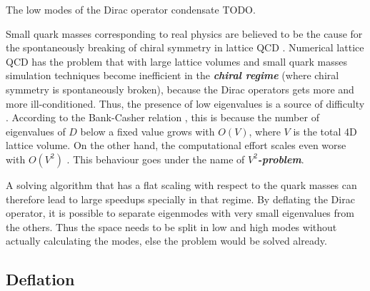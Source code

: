 \documentclass{article}
\theoremstyle{plain} %
\theoremstyle{convention} %
\theoremstyle{remark} %
\def\df#1{\textbf{\textit{#1}}}
\numberwithin{equation}{section}
\begin{document}
The low modes of the Dirac operator condensate TODO.

Small quark masses corresponding to real physics are believed to be the cause for the spontaneously breaking of chiral symmetry in lattice QCD \cite{banks1980}. Numerical lattice QCD has the problem that with large lattice volumes and small quark masses simulation techniques become inefficient in the \df{chiral regime} (where chiral symmetry is spontaneously broken), because the Dirac operators gets more and more ill-conditioned. Thus, the presence of low eigenvalues is a source of difficulty \cite{giusti2003}. According to the Bank-Casher relation \cite{banks1980}, this is because the number of eigenvalues of $D$ below a fixed value grows with $O(V)$, where $V$ is the total 4D lattice volume. On the other hand, the computational effort scales even worse with $O(V^2)$ \cite{luscher2007}. This behaviour goes under the name of \df{$V^2$-problem}.

A solving algorithm that has a flat scaling with respect to the quark masses can therefore lead to large speedups specially in that regime. By deflating the Dirac operator, it is possible to separate eigenmodes with very small eigenvalues from the others. Thus the space needs to be split in low and high modes without actually calculating the modes, else the problem would be solved already.

\subsection{Deflation}
\end{document}
